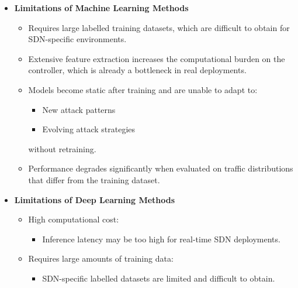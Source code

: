 \documentclass[12pt,a4paper]{article}
\begin{document}
\begin{itemize}
  \item \textbf{Limitations of Machine Learning Methods}
  \begin{itemize}
    \item Requires large labelled training datasets, which are difficult to
    obtain for SDN-specific environments.
    \item Extensive feature extraction increases the computational burden on the
    controller, which is already a bottleneck in real deployments.
    \item Models become static after training and are unable to adapt to:
    \begin{itemize}
      \item New attack patterns
      \item Evolving attack strategies
    \end{itemize}
    without retraining.
    \item Performance degrades significantly when evaluated on traffic
    distributions that differ from the training dataset.
  \end{itemize}
\end{itemize}

\begin{itemize}
  \item \textbf{Limitations of Deep Learning Methods}
  \begin{itemize}
    \item High computational cost:
    \begin{itemize}
      \item Inference latency may be too high for real-time SDN deployments.
    \end{itemize}
    \item Requires large amounts of training data:
    \begin{itemize}
      \item SDN-specific labelled datasets are limited and difficult to obtain.
    \end{itemize}
  \end{itemize}
\end{itemize}

\newpage
\end{document}
